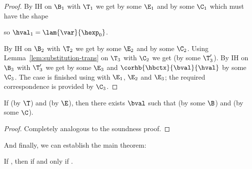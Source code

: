 \begin{proof}
By IH on $\B_1$ with $\T_1$ we get  by some $\E_1$ and  by some $\C_1$ which must have the shape
\begin{prooftree}
\end{prooftree}
so $\hval_1 = \lam{\var}{\hexp_0}$.

By IH on $\B_2$ with $\T_2$ we get  by some $\E_2$ and  by some $\C_2$.
Using Lemma~\ref{lem:substitution-trans} on $\T_3$ with $\C_2$ we get  (by some $\T_3'$).
By IH on $\B_3$ with $\T_3'$ we get  by some $\E_3$ and $\corhb{\hbctx}{\bval}{\hval}$ by some $\C_3$.
The case is finished using  with $\E_1$, $\E_2$ and $\E_3$; the required correspondence is provided by $\C_3$.

\end{proof}

\begin{lemma}[Completeness]
\label{lem:completeness-hb}
If \trahb{\hbctx}{\benv}{\hexp}{\bexp} (by $\T$) and \hev{\hexp}{\hval} (by $\E$), then there exists $\bval$ such that \bev{\benv}{\bexp}{\bval} (by some $\B$) and \corhb{\hbctx}{\bval}{\hval} (by some $\C$).
\end{lemma}

\begin{proof}
Completely analogous to the soundness proof.
\end{proof}

\Twelf

And finally, we can establish the main theorem:

\begin{theorem}
\label{thm:equivalence-hb} If \trahb{\hbctx}{\envnil}{\bexp}{\hexp}, then \hev{\hexp}{\n{\nat}} if and only if \bev{\envnil}{\bexp}{\n{\nat}}.
\end{theorem}

\Twelf



